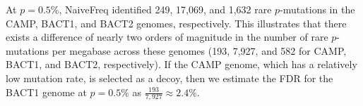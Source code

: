 At $p=0.5$\%, NaiveFreq identified 249, 17,069, and 1,632 rare $p$-mutations in the CAMP, BACT1, and BACT2 genomes, respectively. This illustrates that there exists a difference of nearly two orders of magnitude in the number of rare $p$-mutations per megabase across these genomes (193, 7,927, and 582 for CAMP, BACT1, and BACT2, respectively). If the CAMP genome, which has a relatively low mutation rate, is selected as a decoy, then we estimate the FDR for the BACT1 genome at $p=0.5\%$ as $\frac{193}{7,927} \approx 2.4\%$.\endinput